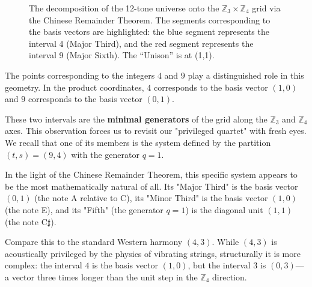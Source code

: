 \documentclass[12pt,letterpaper]{amsart}
\begin{document}
\begin{figure}[H]
    \caption{The decomposition of the 12-tone universe onto the $\mathbb{Z}_3 \times \mathbb{Z}_4$ grid via the Chinese Remainder Theorem. The segments corresponding to the basis vectors are highlighted: the blue segment represents the interval {\color{blue}4} (Major Third), and the red segment represents the interval {\color{red}9} (Major Sixth). The ``Unison'' is at {\color{mygold}(1,1)}.}
    \label{fig:crt_grid}
\end{figure}

The points corresponding to the integers $4$ and $9$ play a distinguished role in this geometry. In the product coordinates, $4$ corresponds to the basis vector $(1,0)$ and $9$ corresponds to the basis vector $(0,1)$.

These two intervals are the \textbf{minimal generators} of the grid along the $\mathbb{Z}_3$ and $\mathbb{Z}_4$ axes. This observation forces us to revisit our "privileged quartet" with fresh eyes. We recall that one of its members is the system defined by the partition $(t,s) = (9,4)$ with the generator $q=1$. 

In the light of the Chinese Remainder Theorem, this specific system appears to be the most mathematically natural of all. Its "Major Third" is the basis vector $(0,1)$ (the note A relative to C), its "Minor Third" is the basis vector $(1,0)$ (the note E), and its "Fifth" (the generator $q=1$) is the diagonal unit $(1,1)$ (the note C$\sharp$).

Compare this to the standard Western harmony $(4,3)$. While $(4,3)$ is acoustically privileged by the physics of vibrating strings, structurally it is more complex: the interval $4$ is the basis vector $(1,0)$, but the interval $3$ is $(0,3)$—a vector three times longer than the unit step in the $\mathbb{Z}_4$ direction.
\end{document}
